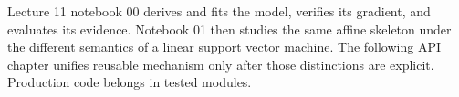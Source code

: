 \begin{notebooklink}
Lecture 11 notebook 00 derives and fits the model, verifies its gradient, and
evaluates its evidence. Notebook 01 then studies the same affine skeleton under
the different semantics of a linear support vector machine. The following API
chapter unifies reusable mechanism only after those distinctions are explicit.
Production code belongs in tested modules.
\end{notebooklink}
